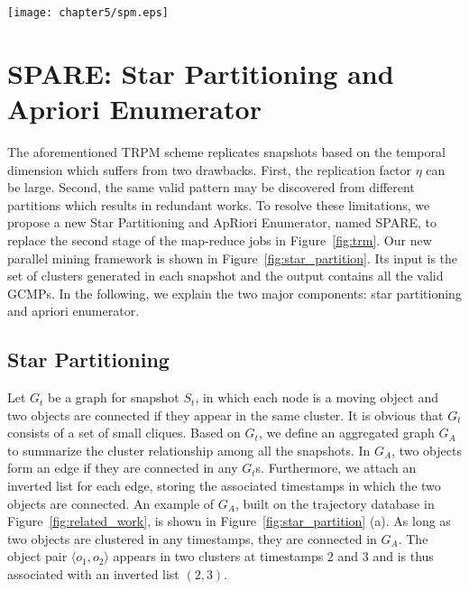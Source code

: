\begin{figure*}[t]
\centering
\texttt{[image: chapter5/spm.eps]}
\caption{Star Partitioning and ApRiori Enumerator (SPARE). (a) Aggregated graph $G_A$ generated from Figure 1. (b) Five star partitions are generated from $G_A$. Star IDs are circled, vertexes and inverted lists are in the connected tables.
(c) Apriori Enumerator with various pruning techniques.}
\label{fig:star_partition}
\end{figure*}

\section{SPARE: Star Partitioning and Apriori Enumerator}
\label{sec:spm}
The aforementioned TRPM scheme replicates snapshots based on the temporal dimension which suffers from two drawbacks. First, the replication factor $\eta$ can be large. Second, the same valid pattern may be discovered from different partitions which results in redundant works.
To resolve these limitations,
we propose a new Star Partitioning and ApRiori Enumerator, named SPARE, 
to replace the second stage of the map-reduce jobs in Figure~\ref{fig:trm}. 
Our new parallel mining framework is shown in Figure~\ref{fig:star_partition}. 
Its input is the set of clusters generated in each snapshot and the output 
contains all the valid GCMPs. In the following, we explain the two major components: 
star partitioning and apriori enumerator.


\subsection{Star Partitioning}
Let $G_t$ be a graph for snapshot $S_t$, in which each node 
is a moving object and two objects are connected if they appear 
in the same cluster. It is obvious that $G_t$ consists of a set of small cliques. 
Based on $G_t$, we define an aggregated graph $G_A$ to summarize the 
cluster relationship among all the snapshots. In $G_A$, two objects
form an edge if they are connected in any $G_t$s. Furthermore, 
we attach an inverted list for each edge, 
storing the associated timestamps in which the two objects are connected. 
An example of $G_A$, built on the trajectory database in Figure~\ref{fig:related_work}, 
is shown in Figure~\ref{fig:star_partition} (a). 
As long as two objects are clustered in any timestamps, they are connected in $G_A$. 
The object pair $\langle o_1,o_2 \rangle$ appears in two clusters at timestamps 
$2$ and $3$ and is thus associated with an inverted list $(2,3)$.


